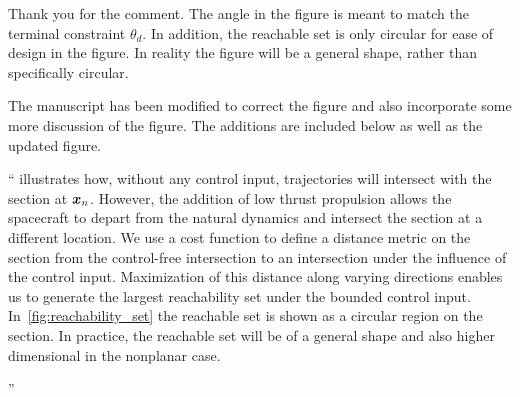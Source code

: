 \documentclass[11pt]{article}
\newenvironment{correction}{\begin{list}{}{\setlength{\leftmargin}{1cm}\setlength{\rightmargin}{1cm}}\vspace{\parsep}\item[]``}{''\end{list}}
\begin{document}
\begin{enumerate}
Thank you for the comment.
The angle in the figure is meant to match the terminal constraint \( \theta_d\).
In addition, the reachable set is only circular for ease of design in the figure.
In reality the figure will be a general shape, rather than specifically circular.

The manuscript has been modified to correct the figure and also incorporate some more discussion of the figure. 
The additions are included below as well as the updated figure.
\begin{correction}
 illustrates how, without any control input, trajectories will intersect with the \Poincare section at \( \bm{x}_n \). 
However, the addition of low thrust propulsion allows the spacecraft to depart from the natural dynamics and intersect the \Poincare section at a different location.
We use a cost function to define a distance metric on the \Poincare section from the control-free intersection to an intersection under the influence of the control input.
Maximization of this distance along varying directions enables us to generate the largest reachability set under the bounded control input.
In~\cref{fig:reachability_set} the reachable set is shown as a circular region on the \Poincare section.
In practice, the reachable set will be of a general shape and also higher dimensional in the nonplanar case.
\begin{figure}
        \centering
        \begin{scaletikzpicturetowidth}{0.5\textwidth}
\end{scaletikzpicturetowidth}
\end{figure}
\end{correction}
\end{enumerate}
\end{document}
